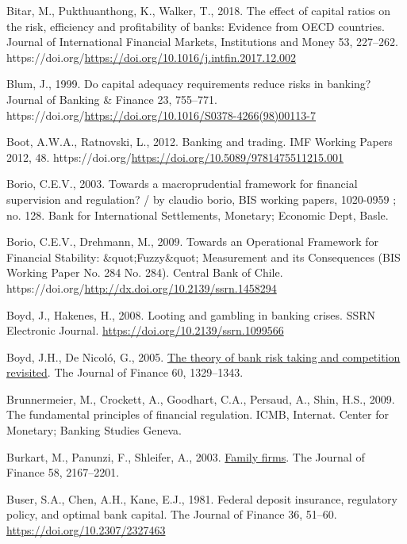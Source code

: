 \documentclass[
  12pt,
  a4paper,
]{scrreprt}
\newlength{\cslhangindent}
\newenvironment{CSLReferences}[2] %
 {\begin{list}{}{%
  \setlength{\itemindent}{0pt}
  \setlength{\leftmargin}{0pt}
  \setlength{\parsep}{0pt}
  \ifodd #1
   \setlength{\leftmargin}{\cslhangindent}
   \setlength{\itemindent}{-1\cslhangindent}
  \fi
  \setlength{\itemsep}{#2\baselineskip}}}
 {\end{list}}
\begin{document}
{{{{\begin{CSLReferences}{1}{0}
Bitar, M., Pukthuanthong, K., Walker, T., 2018. The effect of capital
ratios on the risk, efficiency and profitability of banks: Evidence from
OECD countries. Journal of International Financial Markets, Institutions
and Money 53, 227--262.
https://doi.org/\url{https://doi.org/10.1016/j.intfin.2017.12.002}

Blum, J., 1999. Do capital adequacy requirements reduce risks in
banking? Journal of Banking \& Finance 23, 755--771.
https://doi.org/\url{https://doi.org/10.1016/S0378-4266(98)00113-7}

Boot, A.W.A., Ratnovski, L., 2012. Banking and trading. IMF Working
Papers 2012, 48.
https://doi.org/\url{https://doi.org/10.5089/9781475511215.001}

Borio, C.E.V., 2003. Towards a macroprudential framework for financial
supervision and regulation? / by claudio borio, BIS working papers,
1020-0959 ; no. 128. Bank for International Settlements, Monetary;
Economic Dept, Basle.

Borio, C.E.V., Drehmann, M., 2009. {Towards an Operational Framework for
Financial Stability: \&quot;Fuzzy\&quot; Measurement and its
Consequences} (BIS Working Paper No. 284 No. 284). Central Bank of
Chile. https://doi.org/\url{http://dx.doi.org/10.2139/ssrn.1458294}

Boyd, J., Hakenes, H., 2008. Looting and gambling in banking crises.
SSRN Electronic Journal. \url{https://doi.org/10.2139/ssrn.1099566}

Boyd, J.H., De Nicoló, G., 2005.
\href{http://www.jstor.org.queens.ezp1.qub.ac.uk/stable/3694928}{The
theory of bank risk taking and competition revisited}. The Journal of
Finance 60, 1329--1343.

Brunnermeier, M., Crockett, A., Goodhart, C.A., Persaud, A., Shin, H.S.,
2009. The fundamental principles of financial regulation. ICMB,
Internat. Center for Monetary; Banking Studies Geneva.

Burkart, M., Panunzi, F., Shleifer, A., 2003.
\href{http://www.jstor.org/stable/3648187}{Family firms}. The Journal of
Finance 58, 2167--2201.

Buser, S.A., Chen, A.H., Kane, E.J., 1981. Federal deposit insurance,
regulatory policy, and optimal bank capital. The Journal of Finance 36,
51--60. \url{https://doi.org/10.2307/2327463}


\end{CSLReferences}}}}}
\end{document}
